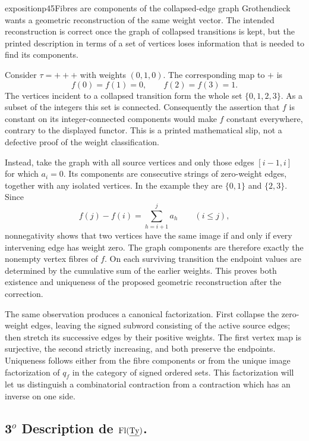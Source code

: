 \begin{dcomment}{exposition}{p45}{Fibres are components of the collapsed-edge graph}
Grothendieck wants a geometric reconstruction of the same weight vector. The intended reconstruction is correct once the graph of collapsed transitions is kept, but the printed description in terms of a set of vertices loses information that is needed to find its components.

Consider $\tau=+++$ with weights $(0,1,0)$. The corresponding map to $+$ is
\[
 f(0)=f(1)=0,\qquad f(2)=f(3)=1.
\]
The vertices incident to a collapsed transition form the whole set $\{0,1,2,3\}$. As a subset of the integers this set is connected. Consequently the assertion that $f$ is constant on its integer-connected components would make $f$ constant everywhere, contrary to the displayed functor. This is a printed mathematical slip, not a defective proof of the weight classification.

Instead, take the graph with all source vertices and only those edges $[i-1,i]$ for which $a_i=0$. Its components are consecutive strings of zero-weight edges, together with any isolated vertices. In the example they are $\{0,1\}$ and $\{2,3\}$. Since
\[
 f(j)-f(i)=\sum_{h=i+1}^{j}a_h\qquad(i\leq j),
\]
nonnegativity shows that two vertices have the same image if and only if every intervening edge has weight zero. The graph components are therefore exactly the nonempty vertex fibres of $f$. On each surviving transition the endpoint values are determined by the cumulative sum of the earlier weights. This proves both existence and uniqueness of the proposed geometric reconstruction after the correction.

The same observation produces a canonical factorization. First collapse the zero-weight edges, leaving the signed subword consisting of the active source edges; then stretch its successive edges by their positive weights. The first vertex map is surjective, the second strictly increasing, and both preserve the endpoints. Uniqueness follows either from the fibre components or from the unique image factorization of $q_f$ in the category of signed ordered sets. This factorization will let us distinguish a combinatorial contraction from a contraction which has an inverse on one side.
\end{dcomment}


\subsection*{3$^o$ Description de $\mathrm{Fl}(\underline{\mathrm{Ty}})$.}

